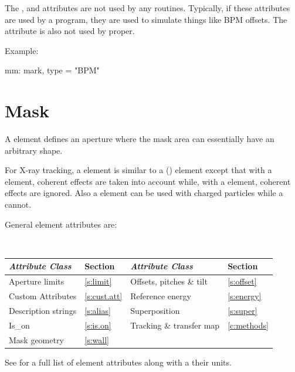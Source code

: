 {
The ,  and  attributes are not used
by any \bmad routines. Typically, if these attributes are used by a
program, they are used to simulate things like BPM offsets. The
 attribute is also not used by \bmad proper. 

Example:
\begin{example}
  mm: mark, type = "BPM"
\end{example}

\section{Mask}
\label{s:mask}

A  element defines an aperture where the mask area can
essentially have an arbitrary shape. 

For X-ray tracking, a  element is similar to a
 () element except that with
a  element, coherent effects are taken into
account while, with a  element, coherent effects are ignored.
Also a  element can be used with charged particles while a
 cannot.

General  element attributes are:
\begin{center}
\tt 
\begin{tabular}{llll} \toprule
  {\sl Attribute Class}      & Section           & {\sl Attribute Class}      & Section         \\ \midrule
  Aperture limits            & \ref{s:limit}     & Offsets, pitches \& tilt   & \ref{s:offset}  \\
  Custom Attributes          & \ref{s:cust.att}  & Reference energy           & \ref{s:energy}  \\
  Description strings        & \ref{s:alias}     & Superposition              & \ref{s:super}   \\
  Is_on                      & \ref{s:is.on}     & Tracking \& transfer map   & \ref{c:methods} \\
  Mask geometry              & \ref{s:wall}      &                            &                 \\ 
  \bottomrule
\end{tabular}
\end{center}
\toffset
See  for a full list of element attributes along with a their units.

}
